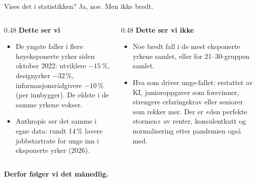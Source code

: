 
\begin{frame}{Vises det i statistikken? Ja, noe. Men ikke bredt.}
\begin{columns}[T,onlytextwidth]
\begin{column}{0.48\textwidth}
{\bfseries\textcolor{illInk}{Dette ser vi}}

\vspace{0.4em}
\small
\begin{itemize}\setlength{\itemsep}{5pt}
  \item De yngste faller i flere høyeksponerte yrker siden oktober 2022: utviklere $-15\,\%$, designyrker $-32\,\%$, informasjonsrådgivere $-10\,\%$ (per innbygger). De eldste i de samme yrkene vokser.
  \item Anthropic ser det samme i egne data: rundt 14\,\% lavere jobbstartrate for unge inn i eksponerte yrker (2026).
\end{itemize}
\end{column}
\begin{column}{0.48\textwidth}
{\bfseries\textcolor{illInk}{Dette ser vi ikke}}

\vspace{0.4em}
\small
\begin{itemize}\setlength{\itemsep}{5pt}
  \item Noe bredt fall i de mest eksponerte yrkene samlet, eller for 21--30-gruppen samlet.
  \item Hva som driver unge-fallet: erstattet av KI, junioroppgaver som forsvinner, strengere erfaringskrav eller seniorer som rekker mer. Der er «den perfekte stormen» av renter, konsulentkutt og normalisering etter pandemien også med.
\end{itemize}
\end{column}
\end{columns}

\vspace{0.6em}
\centering
\textcolor{illInk}{\textbf{Derfor følger vi det månedlig.}}
\end{frame}

